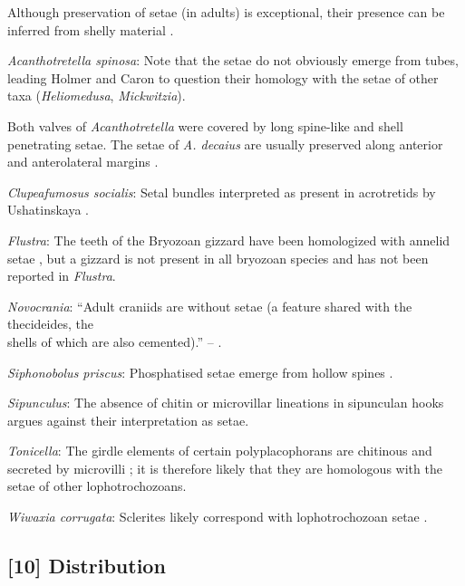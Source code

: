 \documentclass[openany]{book}
\theoremstyle{definition}
\theoremstyle{definition}
\theoremstyle{definition}
\theoremstyle{remark}
\begin{document}
Although preservation of setae (in adults) is exceptional, their
presence can be inferred from shelly material
\citep[see][]{Holmer2006Aspinose}.

\hypertarget{Acanthotretella_spinosa-coding-9}{}
\emph{Acanthotretella spinosa}: Note that the setae do not obviously
emerge from tubes, leading Holmer and Caron to question their homology
with the setae of other taxa (\emph{Heliomedusa}, \emph{Mickwitzia}).

Both valves of \emph{Acanthotretella} were covered by long spine-like
and shell penetrating setae. The setae of \emph{A. decaius} are usually
preserved along anterior and anterolateral margins
\citep{Hu2010Softpart}.

\hypertarget{Clupeafumosus_socialis-coding-9}{}
\emph{Clupeafumosus socialis}: Setal bundles interpreted as present in
acrotretids by Ushatinskaya \citeyearpar{Ushatinskaya2016Protegulumand}.

\hypertarget{Flustra-coding-9}{}
\emph{Flustra}: The teeth of the Bryozoan gizzard have been homologized
with annelid setae \citep{Gordon1975}, but a gizzard is not present in
all bryozoan species and has not been reported in \emph{Flustra}.

\hypertarget{Novocrania-coding-9}{}
\emph{Novocrania}: ``Adult craniids are without setae (a feature shared
with the thecideides, the\\
shells of which are also cemented).'' -- \citet{Williams2007Supplement}.

\hypertarget{Siphonobolus_priscus-coding-9}{}
\emph{Siphonobolus priscus}: Phosphatised setae emerge from hollow
spines \citep{Popov2009Earlyontogeny}.

\hypertarget{Sipunculus-coding-9}{}
\emph{Sipunculus}: The absence of chitin or microvillar lineations in
sipunculan hooks argues against their interpretation as setae.

\hypertarget{Tonicella-coding-9}{}
\emph{Tonicella}: The girdle elements of certain polyplacophorans are
chitinous and secreted by microvilli
\citep{Fischer1980, Leise1982, Leise1988}; it is therefore likely that
they are homologous with the setae of other lophotrochozoans.

\hypertarget{Wiwaxia_corrugata-coding-9}{}
\emph{Wiwaxia corrugata}: Sclerites likely correspond with
lophotrochozoan setae \citep{Butterfield1990, Smith2014, Zhang2015}.

\subsection*{{[}10{]} Distribution}\label{distribution}
\end{document}
